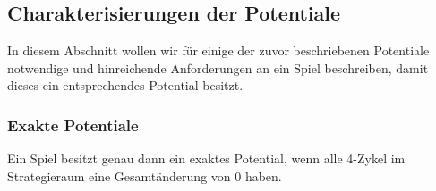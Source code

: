 \subsection{Charakterisierungen der Potentiale}

In diesem Abschnitt wollen wir für einige der zuvor beschriebenen Potentiale notwendige und hinreichende Anforderungen an ein Spiel beschreiben, damit dieses ein entsprechendes Potential besitzt.

\subsubsection{Exakte Potentiale}

\begin{satz}\label{satz:CharExPot}
	Ein Spiel besitzt genau dann ein exaktes Potential, wenn alle 4-Zykel im Strategieraum eine Gesamtänderung von $0$ haben.
\end{satz}

